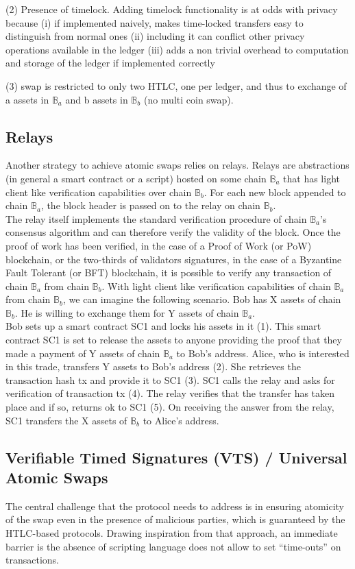 \documentclass{article}      	%
\begin{document}
(2) Presence of timelock. Adding timelock functionality is at odds with privacy because (i) if implemented naively, makes time-locked transfers easy to distinguish from normal ones (ii) including it can conflict other privacy operations available in the ledger (iii) adds a non trivial overhead to computation and storage of the ledger if implemented correctly

(3) swap is restricted to only two HTLC, one per ledger, and thus to exchange of a assets in $\mathbb{B}_a$ and b assets in $\mathbb{B}_b$ (no multi coin swap).
\subsection{Relays}
Another strategy to achieve atomic swaps relies on relays. Relays are abstractions (in general a smart contract or a script) hosted on some
chain $\mathbb{B}_a$ that has light client like verification capabilities over chain $\mathbb{B}_b$. For each new block appended to chain $\mathbb{B}_a$,
the block header is passed on to the relay on chain $\mathbb{B}_b$. \\
The relay itself implements the standard verification procedure of chain $\mathbb{B}_a$’s consensus algorithm and can therefore verify the
validity of the block. Once the proof of work has been verified,
in the case of a Proof of Work (or PoW) blockchain, or the
two-thirds of validators signatures, in the case of a Byzantine
Fault Tolerant (or BFT) blockchain, it is possible to verify any
transaction of chain $\mathbb{B}_a$ from chain $\mathbb{B}_b$. With light client
like verification capabilities of chain $\mathbb{B}_a$ from chain $\mathbb{B}_b$,
we can imagine the following scenario. Bob has X assets of
chain $\mathbb{B}_b$. He is willing to exchange them for Y assets of
chain $\mathbb{B}_a$.  \\
    Bob sets up a smart contract SC1 and locks his
assets in it (1). This smart contract SC1 is set to release the
assets to anyone providing the proof that they made a payment
of Y assets of chain $\mathbb{B}_a$ to Bob’s address. Alice, who is
interested in this trade, transfers Y assets to Bob’s address (2).
She retrieves the transaction hash tx and provide it to SC1 (3).
SC1 calls the relay and asks for verification of transaction tx
(4). The relay verifies that the transfer has taken place and if
so, returns ok to SC1 (5). On receiving the answer from the
relay, SC1 transfers the X assets of $\mathbb{B}_b$ to Alice’s address.

\subsection{Verifiable Timed Signatures (VTS) / Universal Atomic Swaps}
The central challenge that the protocol needs to address is in ensuring atomicity of the swap even in the presence of malicious parties, which is guaranteed by the HTLC-based protocols. Drawing inspiration from that approach, an immediate barrier is the absence of scripting language does not allow to set “time-outs” on transactions.
\end{document}
